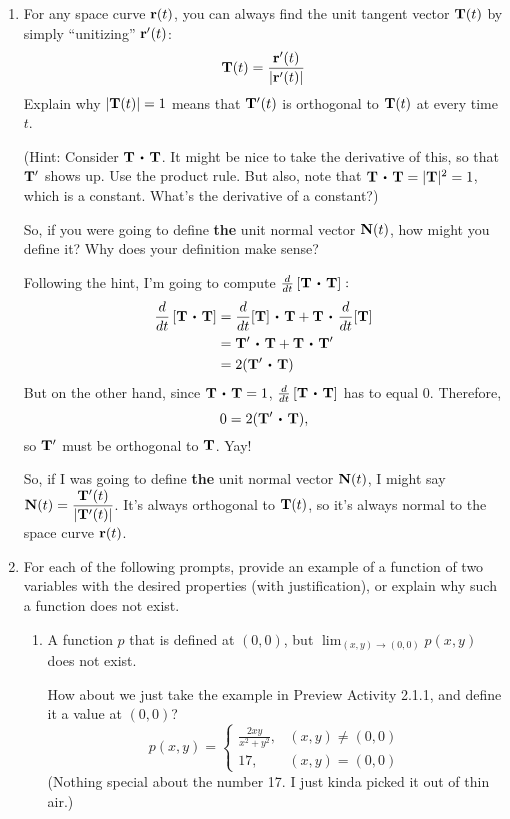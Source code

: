 \begin{enumerate}[leftmargin=0pt]
    \item For any space curve $\mathbf{r}(t)$, you can always find the unit tangent vector $\mathbf{T}(t)$ by simply ``unitizing'' $\mathbf{r}'(t)$:
    \[\mathbf{T}(t) = \frac{\mathbf{r}'(t)}{|\mathbf{r}'(t)|}\]
    Explain why $|\mathbf{T}(t)| = 1$ means that $\mathbf{T}'(t)$ is orthogonal to $\mathbf{T}(t)$ at every time $t$.
    
    (Hint: Consider $\vT \dotp \vT$. It might be nice to take the derivative of this, so that $\mathbf{T}'$ shows up. Use the product rule. But also, note that $\vT \dotp \vT = |\vT|^2 = 1$, which is a constant. What's the derivative of a constant?)
    
    So, if you were going to define \textbf{the} unit normal vector $\mathbf{N}(t)$, how might you define it? Why does your definition make sense?
    
    \begin{red}
        Following the hint, I'm going to compute $\frac{d}{dt} \left[ \vT \dotp \vT\right]:$
        \begin{align*}
            \frac{d}{dt} \left[ \vT \dotp \vT\right] &= 
            \frac{d}{dt}[\vT] \dotp \vT + \vT \dotp \frac{d}{dt}[\vT]\\
            &= \vT' \dotp \vT + \vT \dotp \vT' \\
            &= 2 (\vT' \dotp \vT)
        \end{align*}
        But on the other hand, since $\vT \dotp \vT = 1$, $\frac{d}{dt} \left[ \vT \dotp \vT\right]$ has to equal 0. Therefore, 
        \[0 = 2 (\vT' \dotp \vT),\]
        so $\mathbf{T}'$ must be orthogonal to $\mathbf{T}$. Yay!
        
        So, if I was going to define \textbf{the} unit normal vector $\mathbf{N}(t)$, I might say $\mathbf{N}(t) = \dfrac{\mathbf{T}'(t)}{|\mathbf{T}'(t)|}$. It's always orthogonal to $\mathbf{T}(t)$, so it's always normal to the space curve $\mathbf{r}(t)$.
    \end{red}
    
    \item For each of the following prompts, provide an example of a function of two variables with the desired properties (with justification), or explain why such a function does not exist.
    \begin{enumerate}
        \item A function $p$ that is defined at $(0, 0)$, but $\lim_{(x, y) \to (0, 0)} p(x, y)$ does not exist.
        
        \begin{red}
            How about we just take the example in Preview Activity 2.1.1, and define it a value at $(0, 0)$?
            \[ p(x,y) = 
            \begin{cases}
                \frac{2xy}{x^2+y^2}, & (x, y) \neq (0, 0) \\
                17, & (x, y) = (0, 0)
            \end{cases}
            \]
            (Nothing special about the number 17. I just kinda picked it out of thin air.)
            

\end{red}
\end{enumerate}
\end{enumerate}
